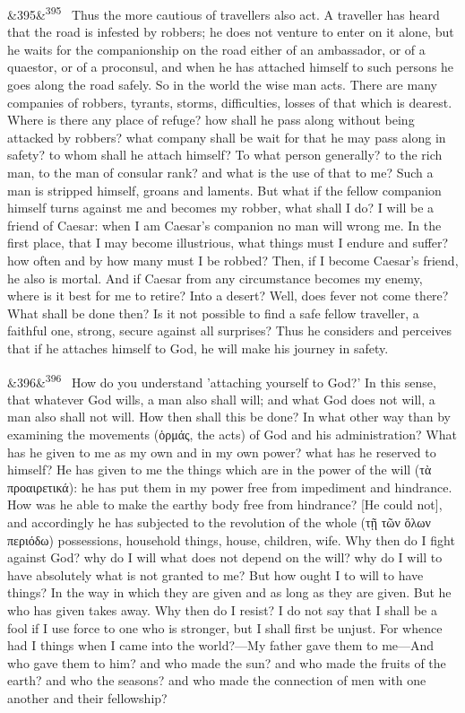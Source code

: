 \documentclass[12pt]{article}
\newcommand{\para}[1][]{\par\noindent\ifx&#1&\else\textsuperscript{\footnotesize #1}~\fi}
\begin{document}
\para[395] Thus the more cautious of travellers also act. A traveller has heard that the road is infested by robbers; he does not venture to enter on it alone, but he waits for the companionship on the road either of an ambassador, or of a quaestor, or of a proconsul, and when he has attached himself to such persons he goes along the road safely. So in the world the wise man acts. There are many companies of robbers, tyrants, storms, difficulties, losses of that which is dearest. Where is there any place of refuge? how shall he pass along without being attacked by robbers? what company shall be wait for that he may pass along in safety? to whom shall he attach himself? To what person generally? to the rich man, to the man of consular rank? and what is the use of that to me? Such a man is stripped himself, groans and laments. But what if the fellow companion himself turns against me and becomes my robber, what shall I do? I will be a friend of Caesar: when I am Caesar's companion no man will wrong me. In the first place, that I may become illustrious, what things must I endure and suffer? how often and by how many must I be robbed? Then, if I become Caesar's friend, he also is mortal. And if Caesar from any circumstance becomes my enemy, where is it best for me to retire? Into a desert? Well, does fever not come there? What shall be done then? Is it not possible to find a safe fellow traveller, a faithful one, strong, secure against all surprises? Thus he considers and perceives that if he attaches himself to God, he will make his journey in safety.

\para[396] How do you understand 'attaching yourself to God?' In this sense, that whatever God wills, a man also shall will; and what God does not will, a man also shall not will. How then shall this be done? In what other way than by examining the movements (ὁρμάς, the acts) of God and his administration? What has he given to me as my own and in my own power? what has he reserved to himself? He has given to me the things which are in the power of the will (τὰ προαιρετικά): he has put them in my power free from impediment and hindrance. How was he able to make the earthy body free from hindrance? [He could not], and accordingly he has subjected to the revolution of the whole (τῇ τῶν ὅλων περιόδω) possessions, household things, house, children, wife. Why then do I fight against God? why do I will what does not depend on the will? why do I will to have absolutely what is not granted to me? But how ought I to will to have things? In the way in which they are given and as long as they are given. But he who has given takes away. Why then do I resist? I do not say that I shall be a fool if I use force to one who is stronger, but I shall first be unjust. For whence had I things when I came into the world?—My father gave them to me—And who gave them to him? and who made the sun? and who made the fruits of the earth? and who the seasons? and who made the connection of men with one another and their fellowship?
\end{document}
